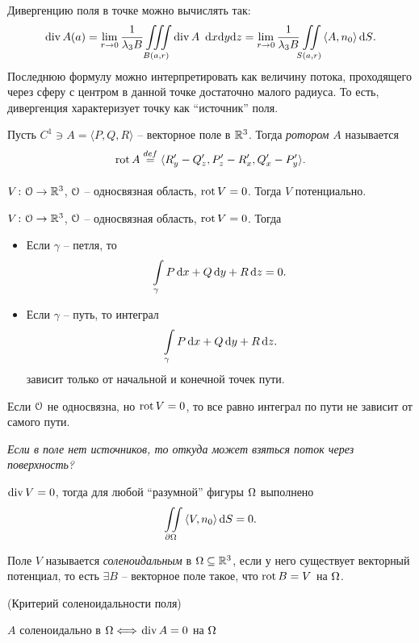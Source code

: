 \begin{remark}
    Дивергенцию поля в точке можно вычислять так:
\[
    \operatorname{div} A(a) = \lim_{r \to 0}{\frac{1}{\lambda_3 B} \iiint\limits_{B(a, r)}{\operatorname{div} A~ \,\mathrm{d} x \mathrm{d} y \mathrm{d} z}} =
    \lim_{r \to 0}{\frac{1}{\lambda_3 B} \iint\limits_{S(a, r)}{\langle A, n_0 \rangle} \,\mathrm{d} S}
.\] 
    Последнюю формулу можно интерпретировать как величину потока, проходящего через
    сферу с центром в данной точке достаточно малого радиуса. То есть, дивергенция
    характеризует точку как ``источник'' поля.
\end{remark}

\begin{definition}
    Пусть $C^1 \ni A = \langle P, Q, R \rangle$ -- векторное поле в $\mathbb{R}^3$. Тогда 
    \textit{ротором} $A$ называется
\[
    \operatorname{rot} A \overset{def}{\underset{}{=}} \langle R'_y - Q'_z, P'_z - R'_x, Q'_x - P'_y \rangle
.\] 
\end{definition}

\begin{remark}
    $V \colon \mathcal{O} \to \mathbb{R}^3$, $\mathcal{O}$ -- односвязная область, $\operatorname{rot} V = 0$. Тогда $V$ потенциально.
\end{remark}

\begin{remark}
    $V \colon \mathcal{O} \to \mathbb{R}^3$, $\mathcal{O}$ -- односвязная область, $\operatorname{rot} V = 0$. Тогда
    \begin{itemize}
        \item Если $\gamma$ -- петля, то
\[
    \int\limits_{\gamma}{P \,\mathrm{d} x + Q \,\mathrm{d} y + R \,\mathrm{d} z} = 0
.\] 
        \item Если $\gamma$ -- путь, то интеграл
\[
    \int\limits_{\gamma}{P \,\mathrm{d} x + Q \,\mathrm{d} y + R \,\mathrm{d} z}
.\] 
            зависит только от начальной и конечной точек пути.
    \end{itemize} 
\end{remark}

\begin{remark}
    Если $\mathcal{O}$ не односвязна, но $\operatorname{rot} V = 0$, то все равно интеграл по пути
    не зависит от самого пути.
\end{remark}

\textit{Если в поле нет источников, то откуда может взяться поток через поверхность?}
\begin{remark}
    $\operatorname{div} V = 0$, тогда для любой ``разумной'' фигуры $\Omega$ выполнено
\[
    \iint\limits_{\partial \Omega}{\langle V, n_0 \rangle \,\mathrm{d} S} = 0
.\] 
\end{remark}

\begin{definition}
    Поле $V$ называется \textit{соленоидальным} в $\Omega \subseteq \mathbb{R}^3$, 
    если у него существует векторный потенциал, то есть
    $\exists B$ -- векторное поле такое, что $\operatorname{rot} B = V$ на $\Omega$.
\end{definition}

\begin{theorem}(Критерий соленоидальности поля)
    
    $A$ соленоидально в $\Omega \Longleftrightarrow$ $\operatorname{div} A = 0$ на $\Omega$
\end{theorem}

